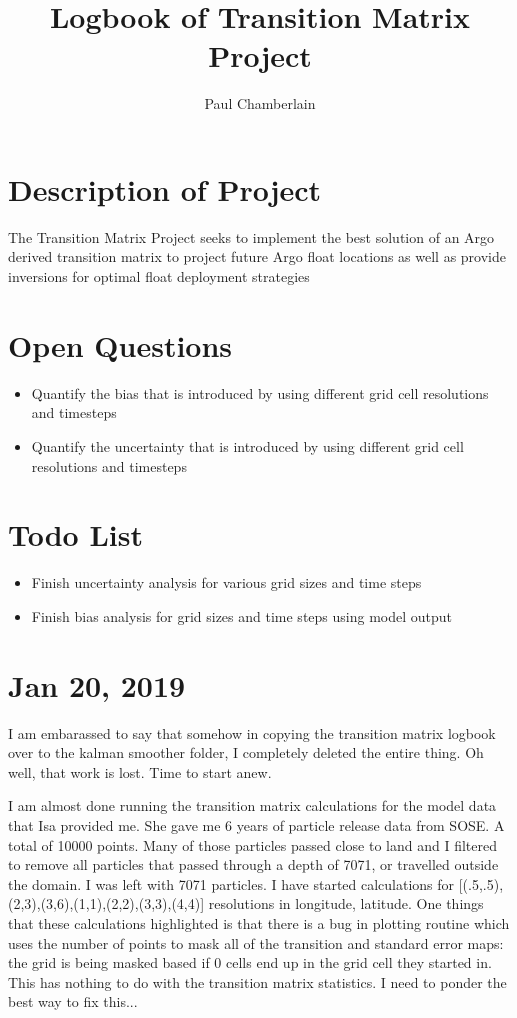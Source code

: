 \documentclass[english]{article}
\begin{document}
\title{Logbook of Transition Matrix Project}

\author{Paul Chamberlain}

\maketitle
\thispagestyle{fancy}


\tableofcontents
\section{Description of Project}
The Transition Matrix Project seeks to implement the best solution of an Argo derived transition matrix to project future Argo float locations as well as provide inversions for optimal float deployment strategies
\section{Open Questions}
\begin{itemize}
\item Quantify the bias that is introduced by using different grid cell resolutions and timesteps
\item Quantify the uncertainty that is introduced by using different grid cell resolutions and timesteps
\end{itemize}

\section{Todo List}
\begin{itemize}
\item Finish uncertainty analysis for various grid sizes and time steps
\item Finish bias analysis for grid sizes and time steps using model output
\end{itemize}

\section{Jan 20, 2019}
I am embarassed to say that somehow in copying the transition matrix logbook over to the kalman smoother folder, I completely deleted the entire thing. Oh well, that work is lost. Time to start anew. 

I am almost done running the transition matrix calculations for the model data that Isa provided me. She gave me 6 years of particle release data from SOSE. A total of 10000 points. Many of those particles passed close to land and I filtered to remove all particles that passed through a depth of 7071, or travelled outside the domain. I was left with 7071 particles. I have started calculations for [(.5,.5),(2,3),(3,6),(1,1),(2,2),(3,3),(4,4)] resolutions in longitude, latitude. One things that these calculations highlighted is that there is a bug in plotting routine which uses the number of points to mask all of the transition and standard error maps: the grid is being masked based if 0 cells end up in the grid cell they started in. This has nothing to do with the transition matrix statistics. I need to ponder the best way to fix this... 
\end{document}
